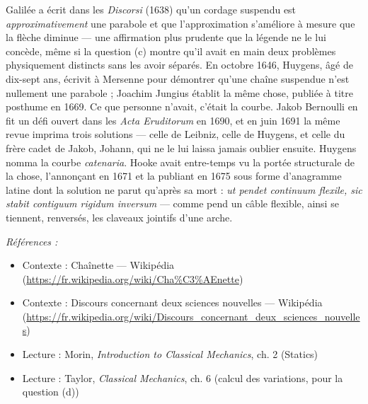 \documentclass[11pt]{article}
\newenvironment{refs}{\par\small\noindent\emph{Références :}\begin{itemize}\setlength\itemsep{0pt}}{\end{itemize}\normalsize}
\begin{document}
\noindent Galilée a écrit dans les \textit{Discorsi} (1638) qu'un cordage suspendu est
\textit{approximativement} une parabole et que l'approximation s'améliore à mesure que la flèche
diminue --- une affirmation plus prudente que la légende ne le lui concède, même si la question (c)
montre qu'il avait en main deux problèmes physiquement distincts sans les avoir séparés. En
octobre 1646, Huygens, âgé de dix-sept ans, écrivit à Mersenne pour démontrer qu'une chaîne
suspendue n'est nullement une parabole ; Joachim Jungius établit la même chose, publiée à titre
posthume en 1669. Ce que personne n'avait, c'était la courbe. Jakob Bernoulli en fit un défi
ouvert dans les \textit{Acta Eruditorum} en 1690, et en juin 1691 la même revue imprima trois
solutions --- celle de Leibniz, celle de Huygens, et celle du frère cadet de Jakob, Johann, qui ne
le lui laissa jamais oublier ensuite. Huygens nomma la courbe \textit{catenaria}. Hooke avait
entre-temps vu la portée structurale de la chose, l'annonçant en 1671 et la publiant en 1675 sous
forme d'anagramme latine dont la solution ne parut qu'après sa mort : \textit{ut pendet continuum
flexile, sic stabit contiguum rigidum inversum} --- comme pend un câble flexible, ainsi se
tiennent, renversés, les claveaux jointifs d'une arche.

\begin{refs}
\item Contexte : Chaînette --- Wikipédia (\url{https://fr.wikipedia.org/wiki/Cha%C3%AEnette})
\item Contexte : Discours concernant deux sciences nouvelles --- Wikipédia (\url{https://fr.wikipedia.org/wiki/Discours_concernant_deux_sciences_nouvelles})
\item Lecture : Morin, \textit{Introduction to Classical Mechanics}, ch. 2 (Statics)
\item Lecture : Taylor, \textit{Classical Mechanics}, ch. 6 (calcul des variations, pour la question (d))
\end{refs}

\bigskip
\end{document}
